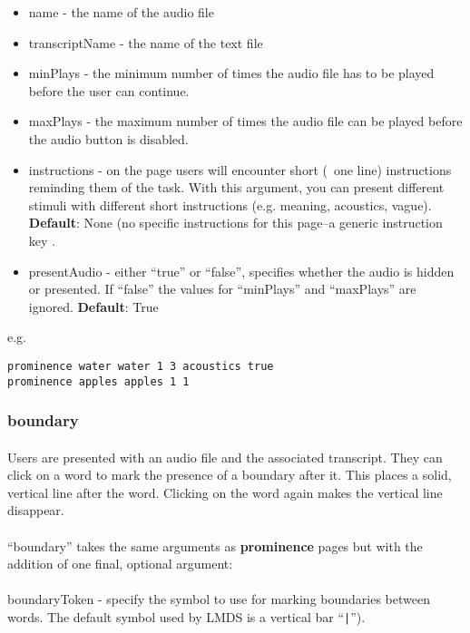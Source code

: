 \begin{itemize}
\item name - the name of the audio file
\item transcriptName - the name of the text file
\item minPlays - the minimum number of times the audio file has to be played before the user can continue.
\item maxPlays - the maximum number of times the audio file can be played before the audio button is disabled. 
\item instructions - on the page users will encounter short (~one line) instructions reminding them of the task.  With this argument, you can present different stimuli with different short instructions (e.g. meaning, acoustics, vague).  \textbf{Default}: None (no specific instructions for this page--a generic instruction key .
\item presentAudio - either ``true'' or ``false'', specifies whether the audio is hidden or presented.  If ``false'' the values for ``minPlays'' and ``maxPlays'' are ignored. \textbf{Default}: True
\end{itemize}

e.g.

\begin{lstlisting}
prominence water water 1 3 acoustics true
prominence apples apples 1 1
\end{lstlisting}

\subsubsection{boundary}

\paragraph{}
Users are presented with an audio file and the associated transcript.  They can click on a word to mark the presence of a boundary after it.  This places a solid, vertical line after the word.  Clicking on the word again makes the vertical line disappear.

\paragraph{}
``boundary'' takes the same arguments as \textbf{prominence} pages but with the addition of one final, optional argument:

\paragraph{}
boundaryToken - specify the symbol to use for marking boundaries between words.  The default symbol used by LMDS is a vertical bar ``\texttt{|}'').

